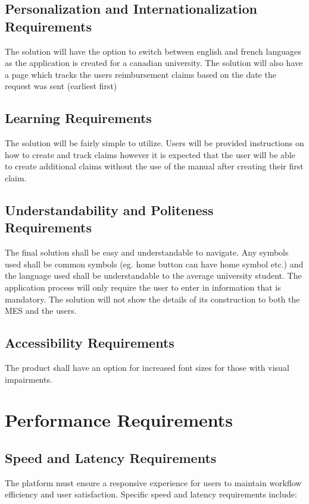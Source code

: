 \documentclass[12pt]{article}
\begin{document}
\subsection{Personalization and Internationalization Requirements}
The solution will have the option to switch between english and french languages as the application is created for a canadian university. The solution will also have a page which tracks the users reimbursement claims based on the date the request was sent (earliest first)

\subsection{Learning Requirements}
The solution will be fairly simple to utilize. Users will be provided instructions on how to create and track claims however it is expected that the user will be able to create additional claims without the use of the manual after creating their first claim.

\subsection{Understandability and Politeness Requirements}
The final solution shall be easy and understandable to navigate. Any symbols used shall be common symbols (eg. home button can have home symbol etc.) and the language used shall be understandable to the average university student. The application process will only require the user to enter in information that is mandatory. The solution will not show the details of its construction to both the MES and the users.

\subsection{Accessibility Requirements}
The product shall have an option for increased font sizes for those with visual impairments.

\section{Performance Requirements}

\subsection{Speed and Latency Requirements}
The platform must ensure a responsive experience for users to maintain workflow efficiency and user satisfaction. Specific speed and latency requirements include:
\end{document}
